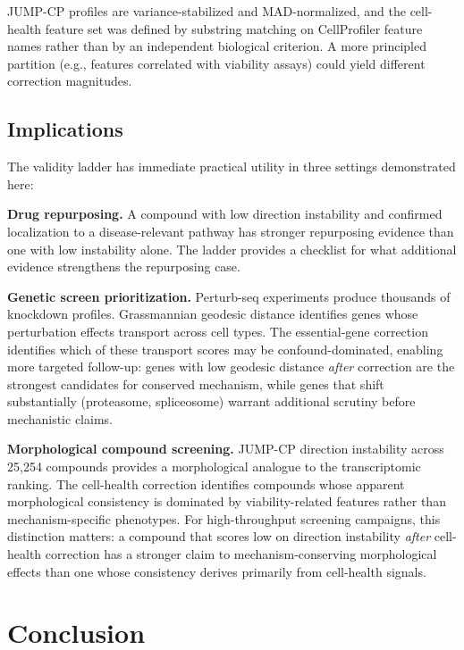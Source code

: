 \documentclass{article}
\begin{document}
JUMP-CP profiles are variance-stabilized and MAD-normalized, and the
cell-health feature set was defined by substring matching on CellProfiler
feature names rather than by an independent biological criterion. A more
principled partition (e.g., features correlated with viability assays)
could yield different correction magnitudes.

\subsection{Implications}

The validity ladder has immediate practical utility in three settings
demonstrated here:

\textbf{Drug repurposing.} A compound with low direction instability and
confirmed localization to a disease-relevant pathway has stronger repurposing
evidence than one with low instability alone. The ladder provides a checklist
for what additional evidence strengthens the repurposing case.

\textbf{Genetic screen prioritization.} Perturb-seq experiments produce
thousands of knockdown profiles. Grassmannian geodesic distance identifies
genes whose perturbation effects transport across cell types. The
essential-gene correction identifies which of these transport scores may be
confound-dominated, enabling more targeted follow-up: genes with low
geodesic distance \emph{after} correction are the strongest candidates for
conserved mechanism, while genes that shift substantially (proteasome,
spliceosome) warrant additional scrutiny before mechanistic claims.

\textbf{Morphological compound screening.} JUMP-CP direction instability
across 25{,}254 compounds provides a morphological analogue to the
transcriptomic ranking. The cell-health correction identifies compounds
whose apparent morphological consistency is dominated by viability-related
features rather than mechanism-specific phenotypes. For high-throughput
screening campaigns, this distinction matters: a compound that scores low
on direction instability \emph{after} cell-health correction has a stronger
claim to mechanism-conserving morphological effects than one whose
consistency derives primarily from cell-health signals.

\section{Conclusion}
\end{document}
